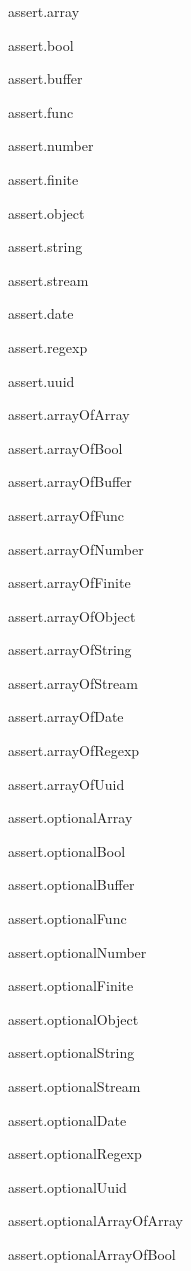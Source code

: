 \begin{DoxyItemize}
\item assert.\+array
\item assert.\+bool
\item assert.\+buffer
\item assert.\+func
\item assert.\+number
\item assert.\+finite
\item assert.\+object
\item assert.\+string
\item assert.\+stream
\item assert.\+date
\item assert.\+regexp
\item assert.\+uuid
\item assert.\+array\+Of\+Array
\item assert.\+array\+Of\+Bool
\item assert.\+array\+Of\+Buffer
\item assert.\+array\+Of\+Func
\item assert.\+array\+Of\+Number
\item assert.\+array\+Of\+Finite
\item assert.\+array\+Of\+Object
\item assert.\+array\+Of\+String
\item assert.\+array\+Of\+Stream
\item assert.\+array\+Of\+Date
\item assert.\+array\+Of\+Regexp
\item assert.\+array\+Of\+Uuid
\item assert.\+optional\+Array
\item assert.\+optional\+Bool
\item assert.\+optional\+Buffer
\item assert.\+optional\+Func
\item assert.\+optional\+Number
\item assert.\+optional\+Finite
\item assert.\+optional\+Object
\item assert.\+optional\+String
\item assert.\+optional\+Stream
\item assert.\+optional\+Date
\item assert.\+optional\+Regexp
\item assert.\+optional\+Uuid
\item assert.\+optional\+Array\+Of\+Array
\item assert.\+optional\+Array\+Of\+Bool

\end{DoxyItemize}
